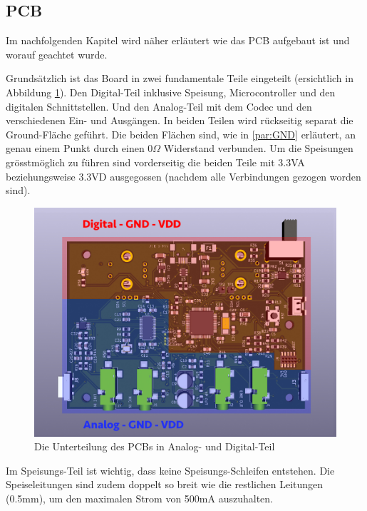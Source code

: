 \newpage
\subsection{PCB}
\label{sec:PCB}

Im nachfolgenden Kapitel wird näher erläutert wie das PCB aufgebaut ist und worauf geachtet wurde.

Grundsätzlich ist das Board in zwei fundamentale Teile eingeteilt (ersichtlich in Abbildung \ref{fig:PCB_GNDVDD}).  Den Digital-Teil inklusive Speisung, Microcontroller und den digitalen Schnittstellen. Und den Analog-Teil mit dem Codec und den verschiedenen Ein- und Ausgängen. In beiden Teilen wird rückseitig separat die Ground-Fläche geführt. Die beiden Flächen sind, wie in \ref{par:GND} erläutert, an genau einem Punkt durch einen $0\Omega$ Widerstand verbunden. Um die Speisungen grösstmöglich zu führen sind vorderseitig die beiden Teile mit 3.3VA beziehungsweise 3.3VD ausgegossen (nachdem alle Verbindungen gezogen worden sind).

\begin{figure} [H]
\begin{center}
 \includegraphics[scale=0.35]{../graphics/PCB-Layout_GNDVDD.jpg}
 \caption{Die Unterteilung des PCBs in Analog- und Digital-Teil}
\label{fig:PCB_GNDVDD}
\end{center}
\end{figure}

Im Speisungs-Teil ist wichtig, dass keine Speisungs-Schleifen entstehen. Die  Speiseleitungen sind zudem doppelt so breit wie die restlichen Leitungen (0.5mm), um den maximalen Strom von 500mA auszuhalten.

